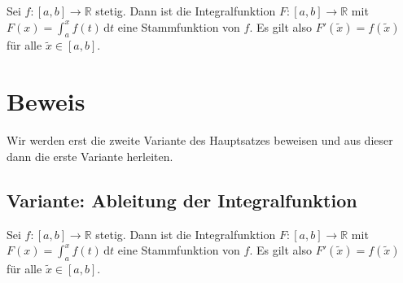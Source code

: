 \documentclass[fontsize=9pt,
               parskip=half-,
               DIV=14,
               listof=chapterentry,
               tocflat]{scrbook}
\begin{document}
\begin{theorem*}
Sei $f:[a,b]\to \mathbb {R} $ stetig. Dann ist die Integralfunktion $F:[a,b]\to \mathbb {R} $ mit $F(x)=\int _{a}^{x}f(t)\,\mathrm {d} t$ eine Stammfunktion von $f$. Es gilt also $F'({\tilde {x}})=f({\tilde {x}})$ für alle ${\tilde {x}}\in [a,b]$.

\end{theorem*}
\clearpage
\section{Beweis}

Wir werden erst die zweite Variante des Hauptsatzes beweisen und aus dieser dann die erste Variante herleiten.

\subsection{Variante: Ableitung der Integralfunktion}

\begin{theorem*}
Sei $f:[a,b]\to \mathbb {R} $ stetig. Dann ist die Integralfunktion $F:[a,b]\to \mathbb {R} $ mit $F(x)=\int _{a}^{x}f(t)\,\mathrm {d} t$ eine Stammfunktion von $f$. Es gilt also $F'({\tilde {x}})=f({\tilde {x}})$ für alle ${\tilde {x}}\in [a,b]$.

\end{theorem*}
\end{document}
